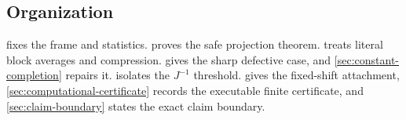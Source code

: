 \subsection{Organization}

 fixes the frame and statistics.
 proves the safe projection theorem.
 treats literal block averages and
compression.   gives the sharp defective
case, and \cref{sec:constant-completion} repairs it.
 isolates the \(J^{-1}\) threshold.
 gives the fixed-shift attachment,
\cref{sec:computational-certificate} records the executable finite
certificate, and \cref{sec:claim-boundary} states the exact claim
boundary.
